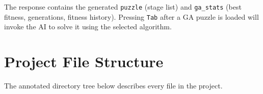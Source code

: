 \documentclass[12pt, a4paper]{report}
\begin{document}
The response contains the generated \texttt{puzzle} (stage list) and
\texttt{ga\_stats} (best fitness, generations, fitness history).  Pressing
\texttt{Tab} after a GA puzzle is loaded will invoke the AI to solve it using
the selected algorithm.

\chapter{Project File Structure}
\label{app:filestructure}

The annotated directory tree below describes every file in the project.
\end{document}
